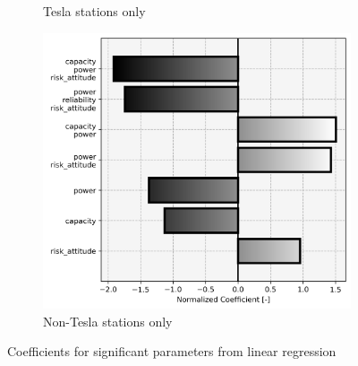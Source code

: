 \begin{figure}[H]
\begin{subfigure}[t]{.33\linewidth}
	\caption{Tesla stations only}
\end{subfigure}%
\begin{subfigure}[t]{.33\linewidth}
	\centering\captionsetup{width = .8\linewidth}
	\includegraphics[width = \linewidth]{figs/significant_parameters_2.png}
	\caption{Non-Tesla stations only}
\end{subfigure}

\caption{Coefficients for significant parameters from linear regression}
\label{fig:significant_parameters_0}

\end{figure}

